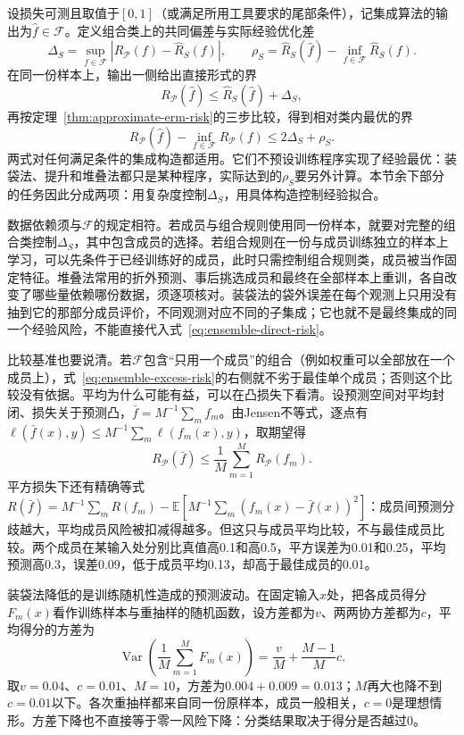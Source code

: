 设损失可测且取值于$[0,1]$（或满足所用工具要求的尾部条件），记集成算法的输出为$\hat f\in\mathcal F$。定义组合类上的共同偏差与实际经验优化差
\[
 \Delta_S=\sup_{f\in\mathcal F}|R_{\mathcal P}(f)-\hat R_S(f)|,
 \qquad
 \rho_S=\hat R_S(\hat f)-\inf_{f\in\mathcal F}\hat R_S(f).
\]
在同一份样本上，输出一侧给出直接形式的界
\begin{equation}
 R_{\mathcal P}(\hat f)\leq\hat R_S(\hat f)+\Delta_S,
 \label{eq:ensemble-direct-risk}
\end{equation}
再按定理~\ref{thm:approximate-erm-risk}的三步比较，得到相对类内最优的界
\begin{equation}
 R_{\mathcal P}(\hat f)-\inf_{f\in\mathcal F}R_{\mathcal P}(f)\leq2\Delta_S+\rho_S.
 \label{eq:ensemble-excess-risk}
\end{equation}
两式对任何满足条件的集成构造都适用。它们不预设训练程序实现了经验最优：装袋法、提升和堆叠法都只是某种程序，实际达到的$\rho_S$要另外计算。本节余下部分的任务因此分成两项：用复杂度控制$\Delta_S$，用具体构造控制经验拟合。

数据依赖须与$\mathcal F$的规定相符。若成员与组合规则使用同一份样本，就要对完整的组合类控制$\Delta_S$，其中包含成员的选择。若组合规则在一份与成员训练独立的样本上学习，可以先条件于已经训练好的成员，此时只需控制组合规则类，成员被当作固定特征。堆叠法常用的折外预测、事后挑选成员和最终在全部样本上重训，各自改变了哪些量依赖哪份数据，须逐项核对。装袋法的袋外误差在每个观测上只用没有抽到它的那部分成员评价，不同观测对应不同的子集成；它也就不是最终集成的同一个经验风险，不能直接代入式~\eqref{eq:ensemble-direct-risk}。

比较基准也要说清。若$\mathcal F$包含“只用一个成员”的组合（例如权重可以全部放在一个成员上），式~\eqref{eq:ensemble-excess-risk}的右侧就不劣于最佳单个成员；否则这个比较没有依据。平均为什么可能有益，可以在凸损失下看清。设预测空间对平均封闭、损失关于预测凸，$\bar f=M^{-1}\sum_mf_m$。由Jensen不等式，逐点有$\ell(\bar f(x),y)\leq M^{-1}\sum_m\ell(f_m(x),y)$，取期望得
\[
 R_{\mathcal P}(\bar f)\leq\frac1M\sum_{m=1}^MR_{\mathcal P}(f_m).
\]
平方损失下还有精确等式$R(\bar f)=M^{-1}\sum_mR(f_m)-\mathbb E[M^{-1}\sum_m(f_m(x)-\bar f(x))^2]$：成员间预测分歧越大，平均成员风险被扣减得越多。但这只与成员平均比较，不与最佳成员比较。两个成员在某输入处分别比真值高0.1和高0.5，平方误差为0.01和0.25，平均预测高0.3，误差0.09，低于成员平均0.13，却高于最佳成员的0.01。

装袋法降低的是训练随机性造成的预测波动。在固定输入$x$处，把各成员得分$F_m(x)$看作训练样本与重抽样的随机函数，设方差都为$v$、两两协方差都为$c$，平均得分的方差为
\[
 \operatorname{Var}\left(\frac1M\sum_{m=1}^MF_m(x)\right)=\frac vM+\frac{M-1}Mc.
\]
取$v=0.04$、$c=0.01$、$M=10$，方差为$0.004+0.009=0.013$；$M$再大也降不到$c=0.01$以下。各次重抽样都来自同一份原样本，成员一般相关，$c=0$是理想情形。方差下降也不直接等于零一风险下降：分类结果取决于得分是否越过0。

